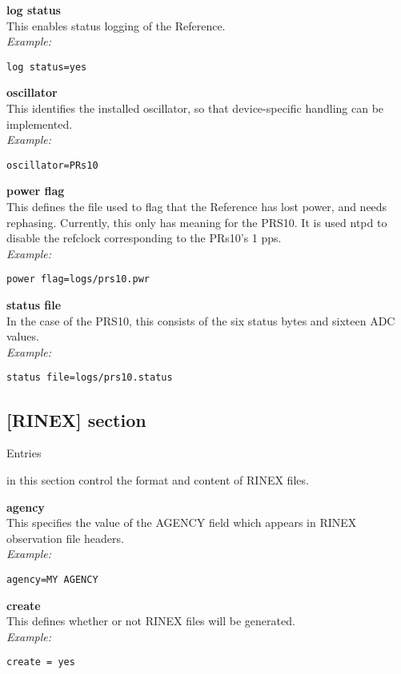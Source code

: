 {\bfseries log status}\\
This enables status logging of the Reference.\\
\textit{Example:}
\begin{lstlisting}
log status=yes
\end{lstlisting}

{\bfseries oscillator}\\
This identifies the installed oscillator, so that device-specific handling can be implemented.\\
\textit{Example:}
\begin{lstlisting}
oscillator=PRs10
\end{lstlisting}

{\bfseries power flag}\\
This defines the file used to flag that the Reference has lost power, and needs rephasing.
Currently, this only has meaning for the PRS10. It is used ntpd to disable the refclock
corresponding to the PRs10's 1 pps.\\
\textit{Example:}
\begin{lstlisting}
power flag=logs/prs10.pwr
\end{lstlisting}

{\bfseries status file}\\
In the case of the PRS10, this consists of the six status bytes and sixteen ADC values.\\
\textit{Example:}
\begin{lstlisting}
status file=logs/prs10.status
\end{lstlisting}


\subsection{[RINEX] section}

\hypertarget{h:rinex}{Entries} in this section control the format and content of RINEX files.

{\bfseries agency}\\
This specifies the value of the AGENCY field which appears in RINEX observation file headers.\\
\textit{Example:}
\begin{lstlisting}
agency=MY AGENCY
\end{lstlisting}

{\bfseries create}\\
This defines whether or not RINEX files will be generated.\\
\textit{Example:}
\begin{lstlisting}
create = yes
\end{lstlisting}

